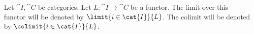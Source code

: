\begin{notation}
Let $\cat{I},\cat{C}$ be categories.
Let $L: \cat{I} \rightarrow \cat{C}$ be a functor.
The limit over this functor will be denoted by
$\limit{i \in \cat{I}}{L}$.
The colimit will be denoted by
$\colimit{i \in \cat{I}}{L}$.
\end{notation}